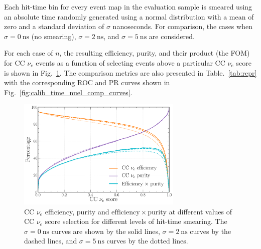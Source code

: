 Each hit-time bin for every event map in the evaluation sample is smeared using an absolute time
randomly generated using a normal distribution with a mean of zero and a standard deviation of
$\sigma$ nanoseconds. For comparison, the cases when $\sigma=0~\mathrm{ns}$ (no smearing),
$\sigma=2~\mathrm{ns}$, and $\sigma=5~\mathrm{ns}$ are considered.

For each case of $n$, the resulting efficiency, purity, and their product (the FOM) for CC
$\nu_{e}$ events as a function of selecting events above a particular CC $\nu_{e}$ score is shown
in Fig.~\ref{fig:calib_time_nuel_eff_curves}. The comparison metrics are also presented in
Table.~\ref{tab:repr} with the corresponding ROC and PR curves shown in
Fig.~\ref{fig:calib_time_nuel_comp_curves}.

\begin{figure} %
    \includegraphics[width=0.7\textwidth]{diagrams/7-results/calib_time_nuel_eff_curves.pdf}
    \caption[CC $\nu_{e}$ efficiency and purity curves for different levels of hit-time smearing]
    {CC $\nu_{e}$ efficiency, purity and $\mathrm{efficiency}\times\mathrm{purity}$ at different
        values of CC $\nu_{e}$ score selection for different levels of hit-time smearing. The
        $\sigma=0~\mathrm{ns}$ curves are shown by the solid lines, $\sigma=2~\mathrm{ns}$ curves
        by the dashed lines, and $\sigma=5~\mathrm{ns}$ curves by the dotted lines.}
    \label{fig:calib_time_nuel_eff_curves}
\end{figure}

